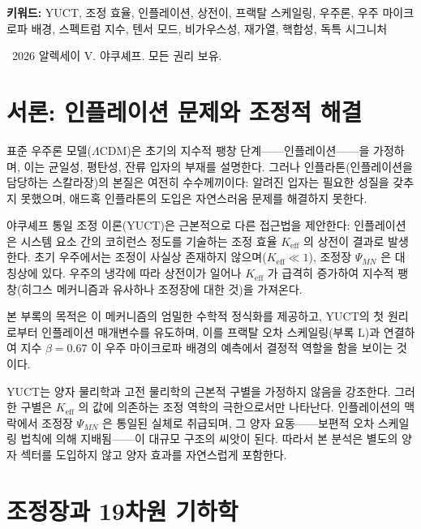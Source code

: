 \documentclass[11pt,a4paper]{article}
\theoremstyle{remark}
\newcommand{\Keff}{K_{\mathrm{eff}}}
\begin{document}
\begin{titlepage}
		\vspace{0.5cm}
		
		\noindent
		{\small\textbf{키워드:}} YUCT, 조정 효율, 인플레이션, 상전이, 프랙탈 스케일링, 우주론, 우주 마이크로파 배경, 스펙트럼 지수, 텐서 모드, 비가우스성, 재가열, 핵합성, 독특 시그니처
		
		\vspace{0.5cm}
		
		\noindent
		\textcopyright\ 2026 알렉세이 V. 야쿠셰프. 모든 권리 보유.
	\end{titlepage}
	
	\tableofcontents
	\newpage
	
	\section{서론: 인플레이션 문제와 조정적 해결}
	\label{sec:intro}
	
	표준 우주론 모델($\Lambda$CDM)은 초기의 지수적 팽창 단계——인플레이션——을 가정하며, 이는 균일성, 평탄성, 잔류 입자의 부재를 설명한다. 그러나 인플라톤(인플레이션을 담당하는 스칼라장)의 본질은 여전히 수수께끼이다: 알려진 입자는 필요한 성질을 갖추지 못했으며, 애드혹 인플라톤의 도입은 자연스러움 문제를 해결하지 못한다.
	
	야쿠셰프 통일 조정 이론(YUCT)은 근본적으로 다른 접근법을 제안한다: 인플레이션은 시스템 요소 간의 코히런스 정도를 기술하는 조정 효율 $\Keff$ 의 상전이 결과로 발생한다. 초기 우주에서는 조정이 사실상 존재하지 않으며($\Keff \ll 1$), 조정장 $\Psi_{MN}$ 은 대칭상에 있다. 우주의 냉각에 따라 상전이가 일어나 $\Keff$ 가 급격히 증가하여 지수적 팽창(히그스 메커니즘과 유사하나 조정장에 대한 것)을 가져온다.
	
	본 부록의 목적은 이 메커니즘의 엄밀한 수학적 정식화를 제공하고, YUCT의 첫 원리로부터 인플레이션 매개변수를 유도하며, 이를 프랙탈 오차 스케일링(부록 L)과 연결하여 지수 $\beta = 0.67$ 이 우주 마이크로파 배경의 예측에서 결정적 역할을 함을 보이는 것이다.
	
	YUCT는 양자 물리학과 고전 물리학의 근본적 구별을 가정하지 않음을 강조한다. 그러한 구별은 $K_{\mathrm{eff}}$ 의 값에 의존하는 조정 역학의 극한으로서만 나타난다. 인플레이션의 맥락에서 조정장 $\Psi_{MN}$ 은 통일된 실체로 취급되며, 그 양자 요동——보편적 오차 스케일링 법칙에 의해 지배됨——이 대규모 구조의 씨앗이 된다. 따라서 본 분석은 별도의 양자 섹터를 도입하지 않고 양자 효과를 자연스럽게 포함한다.
	
	\section{조정장과 19차원 기하학}
	\label{sec:field}
	
\end{document}
